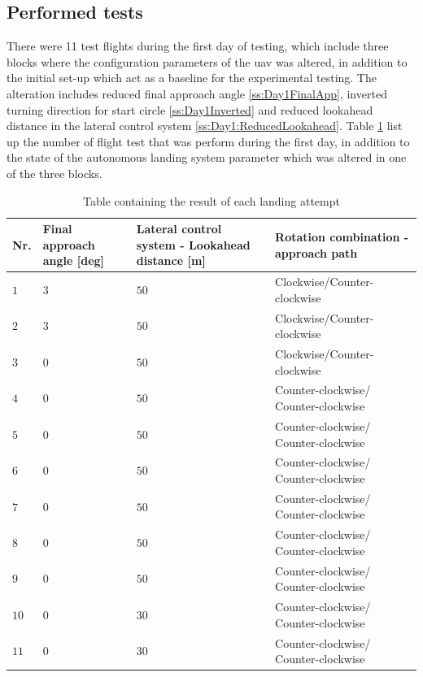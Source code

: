 \subsection{Performed tests}
There were 11 test flights during the first day of testing, which include three blocks where the configuration parameters of the \gls{uav} was altered, in addition to the initial set-up which act as a baseline for the experimental testing. The alteration includes reduced final approach angle \ref{ss:Day1FinalApp}, inverted turning direction for start circle \ref{ss:Day1Inverted} and reduced lookahead distance in the lateral control system \ref{ss:Day1:ReducedLookahead}. Table \ref{tb:Day1ParameterAlteration} list up the number of flight test that was perform during the first day, in addition to the state of the autonomous landing system parameter which was altered in one of the three blocks.
\begin{table}[H]
\begin{tabular}{| p{0.5cm} | p{3cm} | p{4cm} | p{4cm} |}
\hline
\textbf{Nr.} & \textbf{Final approach angle [deg]} & \textbf{Lateral control system - Lookahead distance [m]} &  \textbf{Rotation combination - approach path}\\ \hline
$1$				& $3$ &	$ 50 $ 	& Clockwise/Counter-clockwise		\\ \hline
$2$				& $3$ & $ 50 $	& Clockwise/Counter-clockwise			\\ \hline
$3$				& $0$ & $ 50 $	& Clockwise/Counter-clockwise		\\ \hline
$4$				& $0$ & $ 50 $ 	& Counter-clockwise/ Counter-clockwise				\\ \hline
$5$				& $0$ & $ 50 $ & Counter-clockwise/ Counter-clockwise					\\ \hline
$6$				& $0$ & $ 50 $	& Counter-clockwise/ Counter-clockwise				\\ \hline
$7$				& $0$ &	$ 50 $ & Counter-clockwise/ Counter-clockwise				\\ \hline
$8$				& $0$ & $ 50 $	& Counter-clockwise/ Counter-clockwise				\\ \hline
$9$				& $0$ & $ 50 $ & Counter-clockwise/ Counter-clockwise			\\ \hline
$10$			& $0$ &	$ 30 $ & Counter-clockwise/ Counter-clockwise	\\ \hline
$11$			& $0$ & $ 30 $ & Counter-clockwise/ Counter-clockwise\\ \hline
\end{tabular}
\caption{Table containing the result of each landing attempt}
\label{tb:Day1ParameterAlteration}
\end{table}
